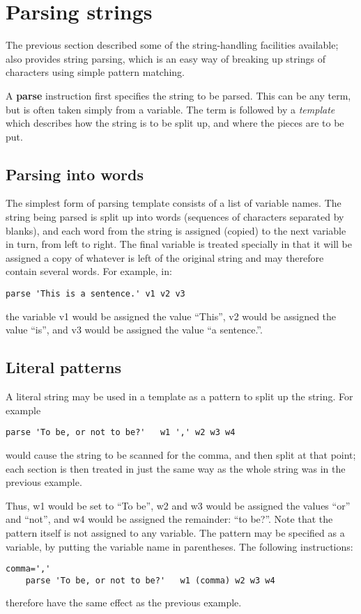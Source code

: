 \section{Parsing strings}
The previous section described some of the string-handling facilities
available; \nr{} also provides string parsing, which is an easy way
of breaking up strings of characters using simple pattern matching.

A \textbf{parse} instruction first specifies the string to be parsed. This can be any term, but is often taken simply from a variable. The term is followed by a \emph{template} which describes how the string is to be split up, and where the pieces are to be put.
\subsection{Parsing into words}
The simplest form of parsing template consists of a list of variable
names. The string being parsed is split up into words (sequences of
characters separated by blanks), and each word from the string is
assigned (copied) to the next variable in turn, from left to
right. The final variable is treated specially in that it will be
assigned a copy of whatever is left of the original string and may
therefore contain several words. For example, in:
\begin{lstlisting}[label=parsingstrings,caption=Parsing Strings]
parse 'This is a sentence.' v1 v2 v3
\end{lstlisting}
the variable v1 would be assigned the value “This”, v2 would be assigned the value
“is”, and v3 would be assigned the value “a sentence.”.
\subsection{Literal patterns}
A literal string may be used in a template as a pattern to split up
the string. For example
\begin{lstlisting}[label=parse,caption=Parse]
    parse 'To be, or not to be?'   w1 ',' w2 w3 w4
\end{lstlisting}
would cause the string to be scanned for the comma, and then split at that point; each section is then treated in just the same way as the whole string was in the previous example.

Thus, w1 would be set to “To be”, w2 and w3 would be assigned the values “or” and “not”, and w4 would be assigned the remainder: “to be?”. Note that the pattern itself is not assigned to any variable.
The pattern may be specified as a variable, by putting the variable
name in parentheses. The following instructions:
\begin{lstlisting}[label=comma,caption=Parse with comma]
    comma=','
    parse 'To be, or not to be?'   w1 (comma) w2 w3 w4
\end{lstlisting}
therefore have the same effect as the previous example.
